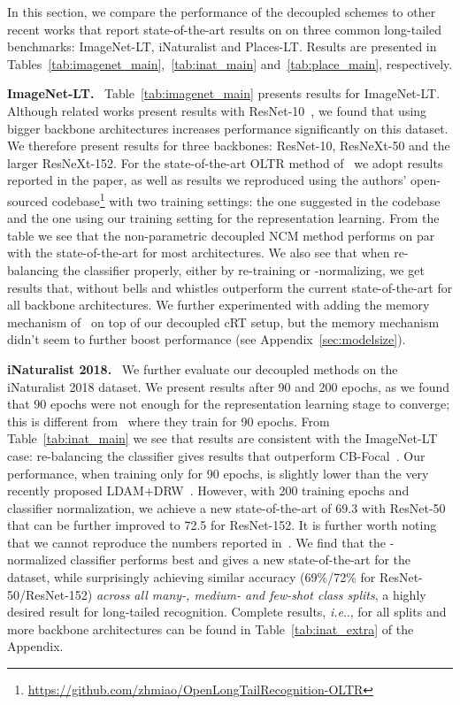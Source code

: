 \documentclass[dvipsnames]{article} \usepackage{iclr2020_conference, times}
\makeatletter
\DeclareRobustCommand\onedot{\futurelet\@let@token\@onedot}
\def\@onedot{\ifx\@let@token.\else.\null\fi\xspace}
\def\ie{\emph{i.e}\onedot} \def\Ie{\emph{I.e}\onedot}
\newcommand{\header}[1]{\noindent\textbf{#1.}~}
\newcommand{\ncm}{NCM\xspace}
\newcommand{\retrain}{cRT\xspace}
\makeatother
\begin{document}
In this section, we compare the performance of the decoupled schemes to other recent works that report state-of-the-art results on on three common long-tailed benchmarks: ImageNet-LT, iNaturalist and Places-LT. Results are presented in Tables~\ref{tab:imagenet_main},~\ref{tab:inat_main} and~\ref{tab:place_main}, respectively. 

\header{ImageNet-LT} Table~\ref{tab:imagenet_main} presents results for ImageNet-LT. Although related works present results with ResNet-10~\citep{liu2019large}, we found that using bigger backbone architectures increases performance significantly on this dataset. We therefore present results for three backbones: ResNet-10, ResNeXt-50 and the larger ResNeXt-152. For the state-of-the-art OLTR method of~\citet{liu2019large} we adopt results  reported in the paper, as well as results we reproduced using the authors' open-sourced codebase\footnote{\url{https://github.com/zhmiao/OpenLongTailRecognition-OLTR}} with two training settings: the one suggested in the codebase and the one using our training setting for the   representation learning. From the table we see that the non-parametric decoupled \ncm method performs on par with the state-of-the-art for most architectures. We also see that when re-balancing the classifier properly, either by re-training or -normalizing, we get results that, without bells and whistles outperform the current state-of-the-art for all backbone architectures. We further experimented with adding the memory mechanism of~\citet{liu2019large} on top of our decoupled \retrain setup, but the memory mechanism didn't seem to further boost performance (see Appendix~\ref{sec:modelsize}).


\header{iNaturalist 2018} We further evaluate our decoupled methods on the iNaturalist 2018 dataset. We present results after 90 and 200 epochs, as we found that 90 epochs were not enough for the representation learning stage to converge; this is different from~\citet{cao2019learning} where they train for 90 epochs. From Table~\ref{tab:inat_main} we see that results are consistent with the ImageNet-LT case: re-balancing the classifier gives results that outperform CB-Focal~\citep{cui2019class}. Our performance, when training only for 90 epochs,  is slightly lower than the very recently proposed LDAM+DRW~\citep{cao2019learning}. However, with 200 training epochs and  classifier normalization, we achieve   a new state-of-the-art of 69.3 with ResNet-50 that can be further improved to 72.5 for ResNet-152. It is further worth noting that we cannot     reproduce the numbers reported in~\citet{cao2019learning}. We find that the -normalized classifier performs best and gives a new state-of-the-art for the dataset, while surprisingly achieving similar accuracy (69\%/72\% for ResNet-50/ResNet-152) \emph{across all many-, medium- and few-shot class splits}, a highly desired result for long-tailed recognition. Complete results, \ie, for all splits and more backbone architectures can be found in Table~\ref{tab:inat_extra} of the Appendix.
\end{document}
